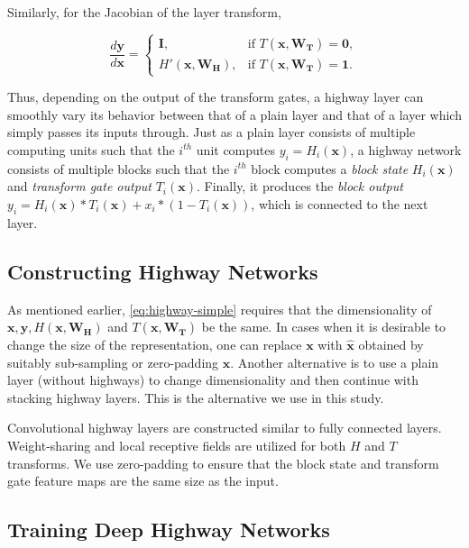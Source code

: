 \documentclass{article}
\renewcommand{\vec}[1]{\mathbf{#1}}
\begin{document}
Similarly, for the Jacobian of the layer transform,

\begin{equation}
\frac{d\vec{y}}{d\vec{x}} = 
\begin{cases}
	\vec{I}, &\text{if } T(\vec{x}, \vec{W_T}) = \mathbf{0},\\
	H'(\vec{x}, \vec{W_H}), &\text{if } T(\vec{x}, \vec{W_T}) = \mathbf{1}.
\end{cases}
\end{equation}

Thus, depending on the output of the transform gates, a highway layer can smoothly vary its behavior between that of a plain layer and that of a layer which simply passes its inputs through. Just as a plain layer consists of multiple computing units such that the $i^{th}$ unit computes $y_i = H_i(\vec{x})$, a highway network consists of multiple blocks such that the $i^{th}$ block computes a \emph{block state} $H_i(\vec{x})$ and \emph{transform gate output} $T_i(\vec{x})$. Finally, it produces the \emph{block output} $y_i = H_i(\vec{x})*T_i(\vec{x}) + x_i*(1 - T_i(\vec{x}))$, which is connected to the next layer. 

\subsection{Constructing Highway Networks}

As mentioned earlier, \autoref{eq:highway-simple} requires that the dimensionality of $\vec{x}, \vec{y}, H(\vec{x}, \vec{W_H})$ and $T(\vec{x}, \vec{W_T})$ be the same. In cases when it is desirable to change the size of the representation, one can replace $\vec{x}$ with $\vec{\hat{x}}$ obtained by suitably sub-sampling or zero-padding $\vec{x}$. Another alternative is to use a plain layer (without highways) to change dimensionality and then continue with stacking highway layers. This is the alternative we use in this study.

Convolutional highway layers are constructed similar to fully connected layers. Weight-sharing and local receptive fields are utilized for both $H$ and $T$ transforms. We use zero-padding to ensure that the block state and transform gate feature maps are the same size as the input.

\subsection{Training Deep Highway Networks}
\end{document}
